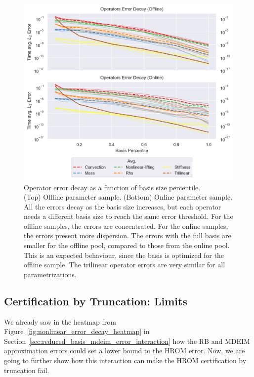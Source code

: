 \documentclass[../../thesis.tex]{subfiles}
\begin{document}
\begin{figure}[h]
    \includegraphics[width =\columnwidth]{research_project/piston/figures/nonlinear_displacement/separable/operators_error_decay_percentile.png}
    \caption{Operator error decay as a function of basis size percentile. \\
    (Top) Offline parameter sample.
    (Bottom) Online parameter sample.
    All the errors decay as the basis size increases, 
    but each operator needs a different basis size to reach the same error threshold.
    For the offline samples, the errors are concentrated.
    For the online samples, the errors present more dispersion.
    The errors with the full basis are smaller for the offline pool, 
    compared to those from the online pool.
    This is an expected behaviour, 
    since the basis is optimized for the offline sample.
    The trilinear operator errors are very similar for all parametrizations.}
    \label{fig:nlinear_disp_operators_error_decay}
\end{figure}

\newpage
\subsection{Certification by Truncation: Limits}
\label{sec:certification_limits}
We already saw in the heatmap from Figure~\ref{fig:nonlinear_error_decay_heatmap}
in Section~\ref{sec:reduced_basis_mdeim_error_interaction}
how the RB and MDEIM approximation errors could 
set a lower bound to the HROM error.
Now, we are going to further show how this interaction can make 
the HROM certification by truncation fail.
\end{document}
